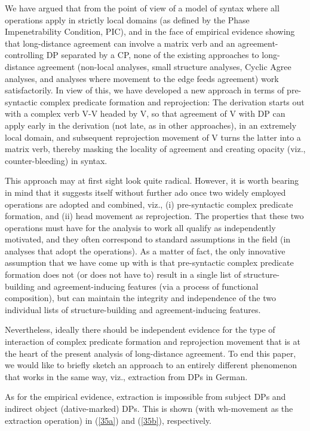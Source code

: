 \documentclass[output=paper
,modfonts
,nonflat]{langsci/langscibook}
\begin{document}
	We have argued that from the point of view of a model of syntax where
	all operations apply in strictly local domains (as defined by the
	Phase Impenetrability Condition, PIC), and in the face of empirical
	evidence showing that long-distance agreement can involve a matrix
	verb and an agreement-controlling DP separated by a CP, none of the
	existing approaches to long-distance agreement (non-local analyses,
	small structure analyses, Cyclic Agree analyses, and analyses where
	movement to the edge feeds agreement) work satisfactorily. In view of
	this, we have developed a new approach in terms of pre-syntactic
	complex predicate formation and reprojection: The derivation starts
	out with a complex verb {V-V} headed by V, so that agreement
	of V with DP can apply early in the derivation (not late, as in
	other approaches), in an extremely local domain, and subsequent
	reprojection movement of V turns the latter into a matrix verb, thereby
	masking the locality of agreement and creating opacity (viz.,
	counter-bleeding) in syntax.  
	
	This approach may at first sight look quite radical. However, it is
	worth bearing in mind that it suggests itself without further ado once
	two widely employed operations are adopted and combined, viz., (i)
	pre-syntactic complex predicate formation, and (ii) head movement as
	reprojection. The properties that these two operations must have for
	the analysis to work all qualify as independently motivated, and they
	often correspond to standard assumptions in the field (in analyses
	that adopt the operations). As a matter of fact, the only innovative
	assumption that we have come up with is that pre-syntactic complex
	predicate formation does not (or does not have to) result in a single
	list of structure-building and agreement-inducing features (via a
	process of functional composition), but can maintain the integrity and
	independence of the two individual lists of structure-building and
	agreement-inducing features.
	
	Nevertheless, ideally there should be independent evidence for the
	type of interaction of complex predicate formation and reprojection
	movement that is at the heart of the present analysis of long-distance
	agreement. To end this paper, we would like to briefly sketch an
	approach to an entirely different phenomenon that works in the same
	way, viz., extraction from DPs in German. 
	
\noindent As for the empirical evidence, extraction is impossible from subject
	DPs and indirect object (dative-marked) DPs. This is shown (with
	wh-movement as the extraction operation) in (\ref{35a}) and (\ref{35b}),
	respectively.
	
\end{document}
